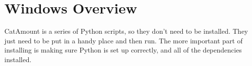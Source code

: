\chapter{Windows Overview}
\hypertarget{windows-overview}{}

CatAmount is a series of Python scripts, so they don't need to be
installed. They just need to be put in a handy place and then run.
The more important part of installing is making sure Python is
set up correctly, and all of the dependencies installed.

